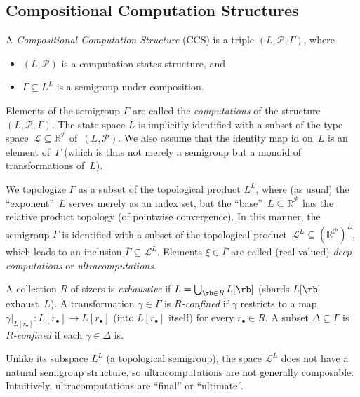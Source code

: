 \subsection{Compositional Computation Structures} 

\begin{definition}\label{def:CCS}
    A \emph{Compositional Computation Structure} (CCS) is a triple $(L,\mathcal{P},\Gamma)$, where
    \begin{itemize}
        \item $(L,\mathcal{P})$ is a computation states structure, and
        \item $\Gamma\subseteq L^L$ is a semigroup under composition.
    \end{itemize}

Elements of the semigroup $\Gamma$ are called the \emph{computations} of the structure $(L,\mathcal{P},\Gamma)$.
The state space $L$ is implicitly identified with a subset of the type space~$\mathcal{L} \subseteq \mathbb{R}^{\mathcal{P}}$ of~$(L, \mathcal{P})$.
We also assume that the identity map $\text{id}$ on~$L$ is an element of~$\Gamma$ (which is thus not merely a semigroup but a monoid of transformations of~$L$).

We topologize $\Gamma$ as a subset of the topological product $L^L$, where (as usual) the ``exponent''~$L$ serves merely as an index set, but the ``base''~$L\subseteq \mathbb{R}^{\mathcal{P}}$ has the relative product topology (of pointwise convergence).
In this manner, the semigroup $\Gamma$ is identified with a subset of the topological product~$\mathcal{L}^L \subseteq (\mathbb{R}^{\mathcal{P}})^L$, which leads to an inclusion $\overline{\Gamma}\subseteq \mathcal{L}^L$.
Elements $\xi\in\overline{\Gamma}$ are called (real-valued) \emph{deep computations} or \emph{ultracomputations}.

A collection $R$ of sizers is \emph{exhaustive} if $L = \bigcup_{\rb\in R}L[\rb]$ (shards $L[\rb]$ exhaust~$L$).
A transformation $\gamma\in\Gamma$ is \emph{$R$-confined} if $\gamma$ restricts to a map $\gamma|_{L[r_\bullet]}\colon L[r_\bullet]\to L[r_\bullet]$ (into $L[r_{\bullet}]$ itself) for every $r_\bullet\in R$.
A subset $\Delta\subseteq\Gamma$ is \emph{$R$-confined} if each $\gamma\in \Delta$ is.
\end{definition}

Unlike its subspace $L^L$ (a topological semigroup), the space $\mathcal{L}^L$ does not have a natural semigroup structure, so ultracomputations are not generally composable.
Intuitively, ultracomputations are “final” or “ultimate”.

